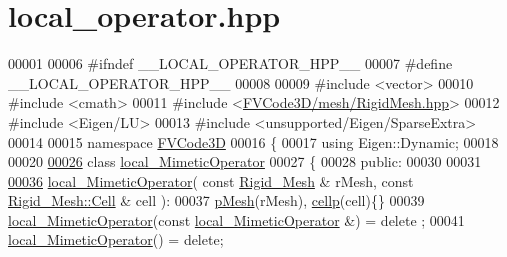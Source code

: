 \hypertarget{local__operator_8hpp_source}{}\section{local\+\_\+operator.\+hpp}
\label{local__operator_8hpp_source}

\begin{DoxyCode}
00001 
00006 \textcolor{preprocessor}{#ifndef \_\_LOCAL\_OPERATOR\_HPP\_\_}
00007 \textcolor{preprocessor}{#define \_\_LOCAL\_OPERATOR\_HPP\_\_}
00008 
00009 \textcolor{preprocessor}{#include <vector>}
00010 \textcolor{preprocessor}{#include <cmath>}
00011 \textcolor{preprocessor}{#include <\hyperlink{RigidMesh_8hpp}{FVCode3D/mesh/RigidMesh.hpp}>}
00012 \textcolor{preprocessor}{#include <Eigen/LU>}
00013 \textcolor{preprocessor}{#include <unsupported/Eigen/SparseExtra>}
00014 
00015 \textcolor{keyword}{namespace }\hyperlink{namespaceFVCode3D}{FVCode3D}
00016 \{
00017 \textcolor{keyword}{using} Eigen::Dynamic;
00018 
00020 
\hypertarget{local__operator_8hpp_source.tex_l00026}{}\hyperlink{classFVCode3D_1_1local__MimeticOperator}{00026} \textcolor{keyword}{class }\hyperlink{classFVCode3D_1_1local__MimeticOperator}{local\_MimeticOperator}
00027 \{
00028 \textcolor{keyword}{public}:
00030 
00031 
\hypertarget{local__operator_8hpp_source.tex_l00036}{}\hyperlink{classFVCode3D_1_1local__MimeticOperator_acea81a53f6e046ebc48b5a701cbb73b0}{00036}         \hyperlink{classFVCode3D_1_1local__MimeticOperator_acea81a53f6e046ebc48b5a701cbb73b0}{local\_MimeticOperator}( \textcolor{keyword}{const} \hyperlink{classFVCode3D_1_1Rigid__Mesh}{Rigid\_Mesh} & rMesh, \textcolor{keyword}{const} 
      \hyperlink{classFVCode3D_1_1Rigid__Mesh_1_1Cell}{Rigid\_Mesh::Cell} & cell ):
00037                 \hyperlink{classFVCode3D_1_1local__MimeticOperator_aaedb6f563c6c3c28afadc1d3725b3f71}{pMesh}(rMesh), \hyperlink{classFVCode3D_1_1local__MimeticOperator_a771437af467a250d8bcaf1d06372ae8e}{cellp}(cell)\{\}
00039     \hyperlink{classFVCode3D_1_1local__MimeticOperator_af70d5b13edb21afd8b3e7c12c2aa7aa6}{local\_MimeticOperator}(\textcolor{keyword}{const} \hyperlink{classFVCode3D_1_1local__MimeticOperator}{local\_MimeticOperator} &) = \textcolor{keyword}{delete}
      ;
00041     \hyperlink{classFVCode3D_1_1local__MimeticOperator_af70d5b13edb21afd8b3e7c12c2aa7aa6}{local\_MimeticOperator}() = \textcolor{keyword}{delete};

\end{DoxyCode}
